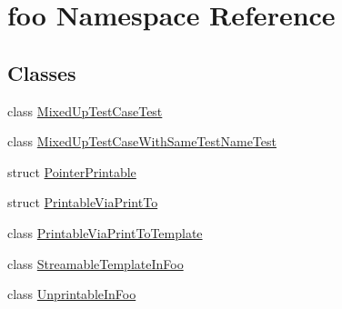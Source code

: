 \hypertarget{namespacefoo}{}\section{foo Namespace Reference}
\label{namespacefoo}
\subsection*{Classes}
\begin{DoxyCompactItemize}
\item 
class \hyperlink{classfoo_1_1_mixed_up_test_case_test}{Mixed\+Up\+Test\+Case\+Test}
\item 
class \hyperlink{classfoo_1_1_mixed_up_test_case_with_same_test_name_test}{Mixed\+Up\+Test\+Case\+With\+Same\+Test\+Name\+Test}
\item 
struct \hyperlink{structfoo_1_1_pointer_printable}{Pointer\+Printable}
\item 
struct \hyperlink{structfoo_1_1_printable_via_print_to}{Printable\+Via\+Print\+To}
\item 
class \hyperlink{classfoo_1_1_printable_via_print_to_template}{Printable\+Via\+Print\+To\+Template}
\item 
class \hyperlink{classfoo_1_1_streamable_template_in_foo}{Streamable\+Template\+In\+Foo}
\item 
class \hyperlink{classfoo_1_1_unprintable_in_foo}{Unprintable\+In\+Foo}
\end{DoxyCompactItemize}
